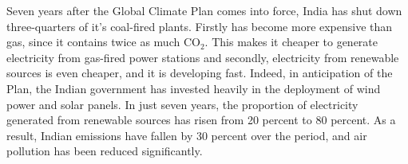 \documentclass[a5paper,english,openany]{memoir}
\begin{document}
Seven years after the Global Climate Plan comes into force,  India has shut down three-quarters of it's coal-fired plants. %
Firstly %
has become %
more expensive than gas, since it contains twice as much CO$_\text{2}$. This makes it cheaper to generate electricity from gas-fired power stations and secondly, %
electricity from renewable sources is even cheaper, and it is developing fast. Indeed, in anticipation of the Plan, the Indian government has invested heavily in the deployment of wind power and solar panels. In just seven years, the proportion of electricity generated from renewable sources has risen from 20 percent to 80 percent. As a result, Indian emissions have fallen by 30 percent over the period, and air pollution has been reduced significantly. %


\end{document}
